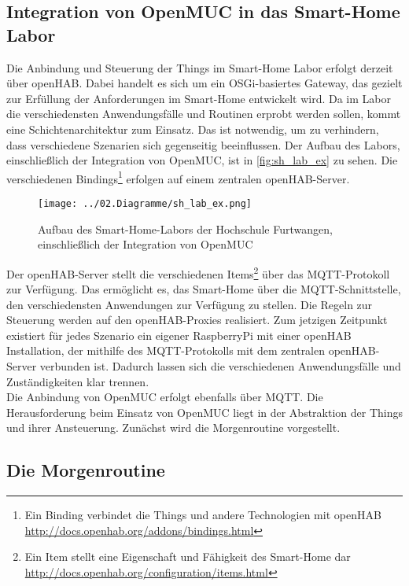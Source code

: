 \subsection{Integration von OpenMUC in das Smart-Home Labor}

Die Anbindung und Steuerung der Things im Smart-Home Labor erfolgt derzeit über openHAB.
Dabei handelt es sich um ein \ac{OSGi}-basiertes Gateway, das gezielt zur Erfüllung der Anforderungen im Smart-Home entwickelt wird.
Da im Labor die verschiedensten Anwendungsfälle und Routinen erprobt werden sollen, kommt eine Schichtenarchitektur zum Einsatz. 
Das ist notwendig, um zu verhindern, dass verschiedene Szenarien sich gegenseitig beeinflussen.
Der Aufbau des Labors, einschließlich der Integration von OpenMUC, ist in \autoref{fig:sh_lab_ex} zu sehen.
Die verschiedenen Bindings\footnote{Ein Binding verbindet die Things und andere Technologien mit openHAB \url{http://docs.openhab.org/addons/bindings.html}} 
erfolgen auf einem zentralen openHAB-Server.\\

\begin{figure}[h]
 \centering
 \texttt{[image: ../02.Diagramme/sh\_lab\_ex.png]}
 \caption{Aufbau des Smart-Home-Labors der Hochschule Furtwangen, einschließlich der Integration von OpenMUC}
 \label{fig:sh_lab_ex}
\end{figure}

Der openHAB-Server stellt die verschiedenen Items\footnote{Ein Item stellt eine Eigenschaft und Fähigkeit des Smart-Home dar \url{http://docs.openhab.org/configuration/items.html}}
über das \ac{MQTT}-Protokoll zur Verfügung.
Das ermöglicht es, das Smart-Home über die \ac{MQTT}-Schnittstelle, den verschiedensten Anwendungen zur Verfügung zu stellen.
Die Regeln zur Steuerung werden auf den openHAB-Proxies realisiert. Zum jetzigen Zeitpunkt existiert für jedes Szenario ein eigener RaspberryPi mit einer openHAB Installation,
der mithilfe des \ac{MQTT}-Protokolls mit dem zentralen openHAB-Server verbunden ist. Dadurch lassen sich die verschiedenen Anwendungsfälle und Zuständigkeiten klar trennen.\\

Die Anbindung von OpenMUC erfolgt ebenfalls über \ac{MQTT}. Die Herausforderung beim Einsatz von
OpenMUC liegt in der Abstraktion der Things und ihrer Ansteuerung.
Zunächst wird die Morgenroutine vorgestellt. %

\subsection{Die Morgenroutine}
\label{subsec:routine}

